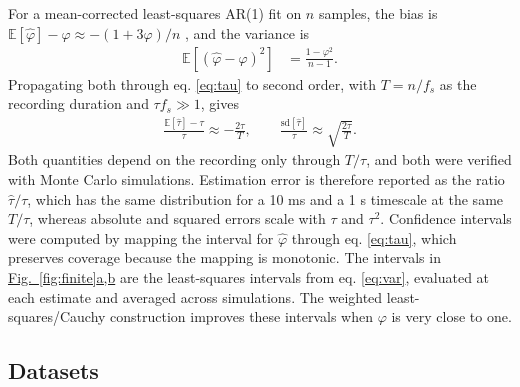 \documentclass[pdflatex,sn-mathphys-num]{sn-jnl}
\newcommand{\figpanel}[2]{\hyperref[#1]{Fig.~\ref*{#1}#2}}
\begin{document}
For a mean-corrected least-squares AR(1) fit on $n$ samples, the bias is $\mathbb{E}[\hat\varphi] - \varphi \approx -(1+3\varphi)/n$ \cite{marriott_bias_1954, kendall_note_1954}, and the variance is
\begin{align}
\mathbb{E}[ (\hat{\varphi} - \varphi)^2 ] &= \frac{1 - \varphi^2}{n-1}. \label{eq:var}
\end{align}
Propagating both through eq. \ref{eq:tau} to second order, with $T = n/f_s$ as the recording duration and $\tau f_s \gg 1$, gives
\begin{align}
\frac{\mathbb{E}[\hat\tau] - \tau}{\tau} \approx -\frac{2\tau}{T}, \qquad
\frac{\mathrm{sd}[\hat\tau]}{\tau} \approx \sqrt{\frac{2\tau}{T}}. \label{eq:finite}
\end{align}
Both quantities depend on the recording only through $T/\tau$, and both were verified with Monte Carlo simulations. Estimation error is therefore reported as the ratio $\hat\tau/\tau$, which has the same distribution for a 10 ms and a 1 s timescale at the same $T/\tau$, whereas absolute and squared errors scale with $\tau$ and $\tau^2$. Confidence intervals were computed by mapping the interval for $\hat\varphi$ through eq. \ref{eq:tau}, which preserves coverage because the mapping is monotonic. The intervals in \figpanel{fig:finite}{a,b} are the least-squares intervals from eq. \ref{eq:var}, evaluated at each estimate and averaged across simulations. The weighted least-squares/Cauchy construction \cite{gallagher_small_2008} improves these intervals when $\varphi$ is very close to one.

\subsection{Datasets}
\end{document}

